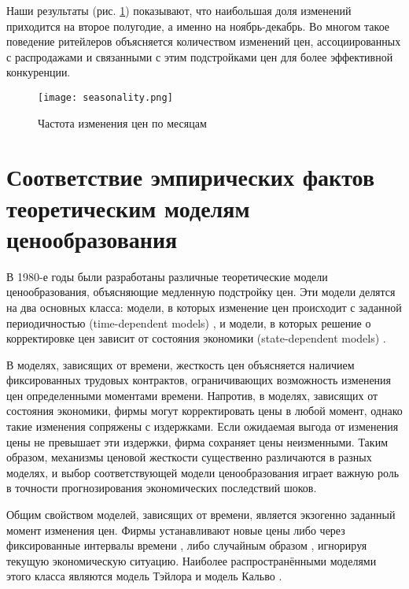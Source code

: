 Наши результаты (рис. \ref{fig:seasonality}) показывают, что наибольшая доля изменений приходится на второе полугодие, а именно на ноябрь-декабрь. Во многом такое поведение ритейлеров объясняется количеством изменений цен, ассоциированных с распродажами и связанными с этим подстройками цен для более эффективной конкуренции.

\begin{figure}[h]
	\centering
	\texttt{[image: seasonality.png]} %
	\caption{Частота изменения цен по месяцам} %
	\label{fig:seasonality} %
\end{figure}
 

\section{Соответствие эмпирических фактов теоретическим моделям ценообразования}\label{sec:ch3/sec3}

	
В 1980-е годы были разработаны различные теоретические модели ценообразования, объясняющие медленную подстройку цен. Эти модели делятся на два основных класса: модели, в которых изменение цен происходит с заданной периодичностью (time-dependent models) \cite{Calvo1983, Taylor1980}, и модели, в которых решение о корректировке цен зависит от состояния экономики (state-dependent models) \cite{CaplinSpulber1987, Dotsey1999, Rotemberg1982}. 

В моделях, зависящих от времени, жесткость цен объясняется наличием фиксированных трудовых контрактов, ограничивающих возможность изменения цен определенными моментами времени. Напротив, в моделях, зависящих от состояния экономики, фирмы могут корректировать цены в любой момент, однако такие изменения сопряжены с издержками. Если ожидаемая выгода от изменения цены не превышает эти издержки, фирма сохраняет цены неизменными. Таким образом, механизмы ценовой жесткости существенно различаются в разных моделях, и выбор соответствующей модели ценообразования играет важную роль в точности прогнозирования экономических последствий шоков.

Общим свойством моделей, зависящих от времени, является экзогенно заданный момент изменения цен. Фирмы устанавливают новые цены либо через фиксированные интервалы времени \cite{Taylor1980}, либо случайным образом \cite{Calvo1983}, игнорируя текущую экономическую ситуацию. Наиболее распространёнными моделями этого класса являются модель Тэйлора \cite{Taylor1980} и модель Кальво \cite{Calvo1983}.

